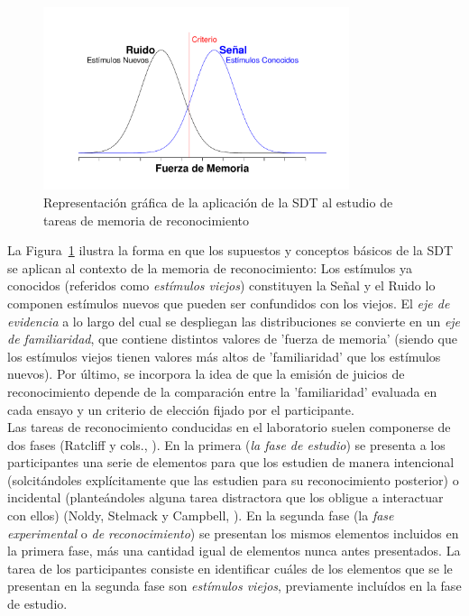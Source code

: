 \begin{figure}[h]
\centering
\includegraphics[width=0.8\textwidth]{Figures/RM_SDT_1} 
\caption[SDT aplicada a tareas de memoria de reconocimiento]{Representación gráfica de la aplicación de la SDT al estudio de tareas de memoria de reconocimiento}
\label{fig:RM_SDT_1}
\end{figure}

La Figura~\ref{fig:RM_SDT_1} ilustra la forma en que los supuestos y conceptos básicos de la SDT se aplican al contexto de la memoria de reconocimiento: Los estímulos ya conocidos (referidos como \textit{estímulos viejos}) constituyen la Señal y el Ruido lo componen estímulos nuevos que pueden ser confundidos con los viejos. El \textit{eje de evidencia} a lo largo del cual se despliegan las distribuciones se convierte en un \textit{eje de familiaridad}, que contiene distintos valores de 'fuerza de memoria' (siendo que los estímulos viejos tienen valores más altos de 'familiaridad' que los estímulos nuevos). Por último, se incorpora la idea de que la emisión de juicios de reconocimiento depende de la comparación entre la 'familiaridad' evaluada en cada ensayo y un criterio de elección fijado por el participante.\\

Las tareas de reconocimiento conducidas en el laboratorio suelen componerse de dos fases (Ratcliff y cols., \citeyear{Ratcliff1992}). En la primera (\textit{la fase de estudio}) se presenta a los participantes una serie de elementos para que los estudien de manera intencional (solcitándoles explícitamente que las estudien para su reconocimiento posterior) o incidental (planteándoles alguna tarea distractora que los obligue a interactuar con ellos) (Noldy, Stelmack y Campbell, \citeyear{Noldy1990}). En la segunda fase (la \textit{fase experimental} o \textit{de reconocimiento}) se presentan los mismos elementos incluidos en la primera fase, más una cantidad igual de elementos nunca antes presentados. La tarea de los participantes consiste en identificar cuáles de los elementos que se le presentan en la segunda fase son \textit{estímulos viejos}, previamente incluídos en la fase de estudio.\\

